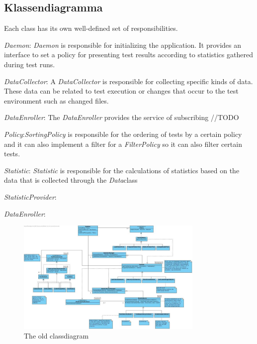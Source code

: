 \documentclass[i2]{oss}
\begin{document}
\subsection{Klassendiagramma}
\label{ssec:Klassendiagramma}

Each class has its own well-defined set of responsibilities.

\begin{description}

\item \emph{Daemon}: \emph{Daemon} is responsible for initializing the 
application. It provides an interface to set a policy for presenting 
test results according to statistics gathered during test runs.

\item \emph{DataCollector}: A \emph{DataCollector} is responsible for
collecting specific kinds of data. These data can be related to test
execution or changes that occur to the test environment such as changed
files.

\item \emph{DataEnroller}: The \emph{DataEnroller} provides the service
of subscribing //TODO

\item \emph{Policy}:\emph{SortingPolicy} is responsible for the ordering of tests by a certain policy and it can also implement a filter for a \emph{FilterPolicy} so it can also filter certain tests.

\item \emph{Statistic}: \emph{Statistic} is responsible for the calculations of statistics based on the data that is collected through the \emph{Data}class

\item \emph{StatisticProvider}: 

\item \emph{DataEnroller}: 



\end{description}


\begin{figure}[tbp]
\begin{center}
    \includegraphics[width=0.8\textwidth]{klassendiagramOud}
    \caption{The old classdiagram}
	\label{fig:kd-oud}
\end{center}
\end{figure}
\end{document}
